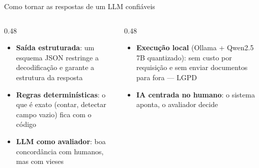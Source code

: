 \documentclass[aspectratio=169,11pt,xcolor=table]{beamer}
\begin{document}
\begin{frame}{Como tornar as respostas de um LLM confiáveis}
  \begin{columns}[T]
    \begin{column}{0.48\textwidth}
      \begin{itemize}\setlength\itemsep{0.6em}
        \item \textbf{Saída estruturada}: um esquema JSON restringe a decodificação e
              garante a estrutura da resposta \cite{Willard2023}
        \item \textbf{Regras determinísticas}: o que é exato (contar, detectar campo vazio)
              fica com o código
        \item \textbf{LLM como avaliador}: boa concordância com humanos, mas com vieses
              \cite{Zheng2023}
      \end{itemize}
    \end{column}
    \begin{column}{0.48\textwidth}
      \begin{itemize}\setlength\itemsep{0.6em}
        \item \textbf{Execução local} (Ollama + Qwen2.5 7B quantizado): sem custo por
              requisição e sem enviar documentos para fora --- LGPD \cite{Brasil2018}
        \item \textbf{IA centrada no humano}: o sistema aponta, o avaliador decide
              \cite{Shneiderman2022}
      \end{itemize}
    \end{column}
  \end{columns}
\end{frame}
\end{document}

